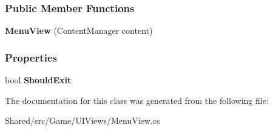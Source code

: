\subsubsection*{Public Member Functions}
\begin{DoxyCompactItemize}
\item 
\hypertarget{class_midnight_blue_1_1_menu_view_a80f778b2634f4b660f7f5e0393271a06}{}\label{class_midnight_blue_1_1_menu_view_a80f778b2634f4b660f7f5e0393271a06} 
{\bfseries Menu\+View} (Content\+Manager content)
\end{DoxyCompactItemize}
\subsubsection*{Properties}
\begin{DoxyCompactItemize}
\item 
\hypertarget{class_midnight_blue_1_1_menu_view_a8d81609074b935a6af5d9ac4238a73ee}{}\label{class_midnight_blue_1_1_menu_view_a8d81609074b935a6af5d9ac4238a73ee} 
bool {\bfseries Should\+Exit}
\end{DoxyCompactItemize}


The documentation for this class was generated from the following file\+:\begin{DoxyCompactItemize}
\item 
Shared/src/\+Game/\+U\+I\+Views/Menu\+View.\+cs\end{DoxyCompactItemize}
